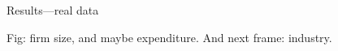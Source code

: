 \documentclass[12pt]{beamer}
\begin{document}
%
%
%

\begin{frame}{Results---real data}

Fig: firm size, and maybe expenditure. And next frame: industry.


\end{frame}
\end{document}
